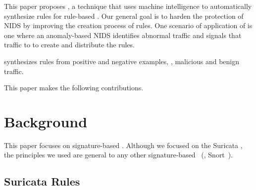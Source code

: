 \documentclass[runningheads]{llncs}
\begin{document}

This paper proposes \tname{}, a technique that uses machine
intelligence to automatically synthesize rules for rule-based
\nids. Our general goal is to harden the protection of NIDS by
improving the creation process of rules. One scenario of application
of \tname{} is one where an anomaly-based NIDS identifies abnormal
traffic and signals that traffic to \tname{} to create and distribute
the rules.


\tname{} synthesizes rules from positive and negative examples, \ie{},
malicious and benign traffic.



This paper makes the following contributions.

\section{Background}

This paper focuses on signature-based \nids. Although we focused on
the Suricata \nids, the principles we used are general to any other
signature-based \nids~(\eg{}, Snort~\cite{snort}).

\subsection{Suricata Rules}
\label{sec:example-suricata-rules}
\end{document}
